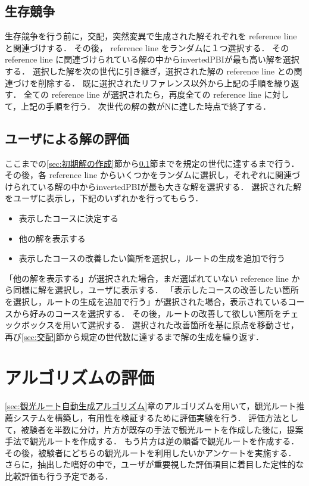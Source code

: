 \subsection{生存競争}\label{sec:生存競争}
生存競争を行う前に，交配，突然変異で生成された解それぞれを reference line と関連づけする．
その後， reference line をランダムに１つ選択する．
その reference line に関連づけられている解の中からinvertedPBIが最も高い解を選択する．
選択した解を次の世代に引き継ぎ，選択された解の reference line との関連づけを削除する．
既に選択されたリファレンス以外から上記の手順を繰り返す．
全ての reference line が選択されたら，再度全ての reference line に対して，上記の手順を行う．
次世代の解の数がNに達した時点で終了する．

\subsection{ユーザによる解の評価}\label{sec:ユーザによる解の評価}
ここまでの\ref{sec:初期解の作成}節から\ref{sec:生存競争}節までを規定の世代に達するまで行う．
その後，各 reference line からいくつかをランダムに選択し，それぞれに関連づけられている解の中からinvertedPBIが最も大きな解を選択する．
選択された解をユーザに表示し，下記のいずれかを行ってもらう．
\begin{itemize}
    \item 表示したコースに決定する
    \item 他の解を表示する
    \item 表示したコースの改善したい箇所を選択し，ルートの生成を追加で行う
  \end{itemize}
「他の解を表示する」が選択された場合，まだ選ばれていない reference line から同様に解を選択し，ユーザに表示する．
「表示したコースの改善したい箇所を選択し，ルートの生成を追加で行う」が選択された場合，表示されているコースから好みのコースを選択する．
その後，ルートの改善して欲しい箇所をチェックボックスを用いて選択する．
選択された改善箇所を基に原点を移動させ，再び\ref{sec:交配}節から規定の世代数に達するまで解の生成を繰り返す．

\section{アルゴリズムの評価}\label{sec:アルゴリズムの評価}
\ref{sec:観光ルート自動生成アルゴリズム}章のアルゴリズムを用いて，観光ルート推薦システムを構築し，有用性を検証するために評価実験を行う．
評価方法として，被験者を半数に分け，片方が既存の手法で観光ルートを作成した後に，提案手法で観光ルートを作成する．
もう片方は逆の順番で観光ルートを作成する．
その後，被験者にどちらの観光ルートを利用したいかアンケートを実施する．
さらに，抽出した嗜好の中で，ユーザが重要視した評価項目に着目した定性的な比較評価も行う予定である．

